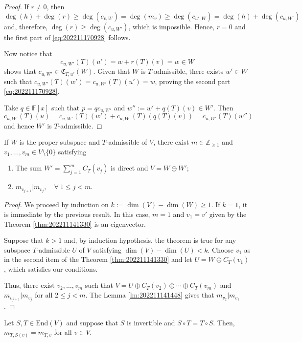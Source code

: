 \begin{proof}
  If $r \neq 0$, then $\deg(h) + \deg(r) \geq \deg(c_{v,W}) = \deg(m_v) \geq \deg(c_{u',W}) = \deg(h) + \deg(c_{u,W'})$ and, therefore, $\deg(r) \geq \deg(c_{u,W'})$, which is impossible. Hence, $r = 0$ and the first part of \eqref{eq:202211170928} follows.
  
  Now notice that
  \[
  	c_{u,W'}(T)(u') = w + r(T)(v) = w \in W
  \]
  shows that $c_{u,W'} \in \mathfrak{C}_{T, u'}(W)$. Given that $W$ is $T$-admissible, there exists $w' \in W$ such that $c_{u,W'}(T)(w') = c_{u,W'}(T)(u') = w$, proving the second part \eqref{eq:202211170928}.

  Take $q \in \mathbb{F}[x]$ such that $p = q c_{u,W'}$ and $w'' := w' + q(T)(v) \in W'$. Then
  \[
    c_{u,W'}(T)(u) = c_{u, W'}(T)(w') + c_{u, W'}(T)(q(T)(v)) = c_{u,W'}(T)(w'')
  \]
  and hence $W'$ is $T$-admissible.
\end{proof}

\begin{theorem}
	If $W$ is the proper subspace and $T$-admissible of $V$, there exist $m \in \mathbb{Z}_{\geq 1}$ and $v_1, \ldots, v_m \in V \setminus \{ 0 \}$ satisfying
	\begin{enumerate}
		\item The sum $W' = \sum_{j=1}^m C_T(v_j)$ is direct and $V = W \oplus W'$;
		\item $m_{v_{j+1}} | m_{v_j}, \quad \forall ~1 \leq j < m$.
	\end{enumerate}
\end{theorem}

\begin{proof}
	We proceed by induction on $k := \dim(V) - \dim(W) \geq 1$. If $k = 1$, it is immediate by the previous result. In this case, $m = 1$ and $v_1 = v'$ given by the Theorem \ref{thm:202211141330} is an eigenvector.
	
	Suppose that $k > 1$ and, by induction hypothesis, the theorem is true for any subspace $T$-admissible $U$ of $V$ satisfying $\dim(V) - \dim(U) < k$. Choose $v_1$ as in the second item of the Theorem \ref{thm:202211141330} and let $U = W \oplus C_T(v_1)$, which satisfies our conditions.
	
	Thus, there exist $v_2, \ldots, v_m$ such that $V = U \oplus C_T(v_2) \oplus \cdots \oplus C_T(v_m)$ and $m_{v_{j+1}} | m_{v_j}$ for all $2 \leq j < m$. The Lemma \ref{lm:202211141448} gives that $m_{v_2} | m_{v_1}$.
\end{proof}

\begin{lemma}\label{lm:202211170945}
	Let $S, T \in \text{End}(V)$ and suppose that $S$ is invertible and $S \circ T = T \circ S$. Then, $m_{T,S(v)} = m_{T,v}$ for all $v \in V$.
\end{lemma}

